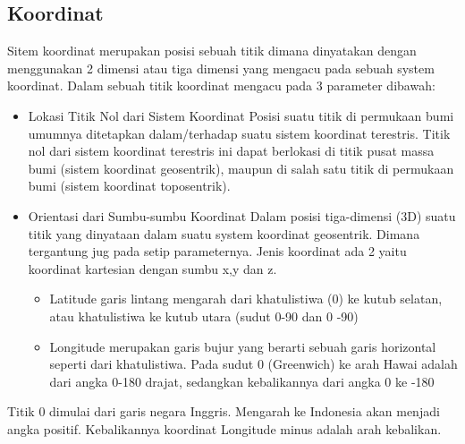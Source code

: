 \subsection{Koordinat}
Sitem koordinat merupakan posisi sebuah titik dimana dinyatakan dengan menggunakan 2 dimensi atau tiga dimensi yang mengacu pada sebuah system koordinat. Dalam sebuah titik koordinat mengacu pada 3 parameter dibawah: 
\begin{itemize}
	\item Lokasi Titik Nol dari Sistem Koordinat
Posisi suatu titik di permukaan bumi umumnya ditetapkan dalam/terhadap suatu sistem koordinat terestris. Titik nol dari sistem koordinat terestris ini dapat berlokasi di titik pusat massa bumi (sistem koordinat geosentrik), maupun di salah satu titik di permukaan bumi (sistem koordinat toposentrik).

	\item Orientasi dari Sumbu-sumbu Koordinat
	Dalam posisi tiga-dimensi (3D) suatu titik  yang dinyataan dalam suatu system koordinat geosentrik. Dimana tergantung jug pada setip parameternya. Jenis koordinat ada 2 yaitu koordinat kartesian dengan sumbu x,y dan z. 
	\begin{itemize}
	\item Latitude
	garis lintang mengarah dari khatulistiwa (0) ke kutub selatan, atau khatulistiwa ke kutub utara (sudut 0-90 dan 0 -90)

	\item Longitude
	merupakan garis bujur yang berarti sebuah  garis horizontal seperti dari khatulistiwa. Pada sudut 0 (Greenwich) ke arah Hawai adalah dari angka 0-180 drajat, sedangkan kebalikannya dari angka 0 ke -180

\end{itemize}
\end{itemize}
Titik 0 dimulai dari garis negara Inggris. Mengarah ke Indonesia akan menjadi angka positif. Kebalikannya koordinat Longitude minus adalah arah kebalikan.


